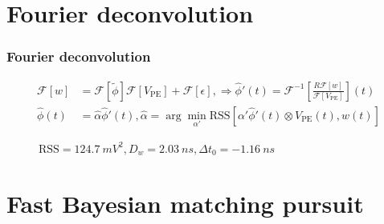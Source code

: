 \documentclass{beamer}
\begin{document}
\begin{CJK*}{UTF8}{gbsn}
\section{Fourier deconvolution}

\begin{frame}
\frametitle{Fourier deconvolution}
\begin{align*}
  \mathcal{F}[w] &= \mathcal{F}[\tilde{\phi}]\mathcal{F}[V_\mathrm{PE}] + \mathcal{F}[\epsilon],\Rightarrow \hat{\phi}'(t) = \mathcal{F}^{-1}\left[\frac{R \mathcal{F}[w]}{\mathcal{F}[V_\mathrm{PE}]}\right](t) \\
  \hat{\phi}(t) &= \hat{\alpha}\hat{\phi}'(t),\hat{\alpha} = \arg \underset{\alpha'}{\min}\mathrm{RSS}\left[\alpha'\hat{\phi}'(t)\otimes V_\mathrm{PE}(t),w(t)\right]
\end{align*}
\begin{figure}
    \centering
    \resizebox{0.55\textwidth}{!}{}
    \caption{$\mathrm{RSS}=\SI{124.7}{mV^2},D_w=\SI{2.03}{ns},\Delta t_0=\SI{-1.16}{ns}$}
\end{figure}
\end{frame}

\section{Fast Bayesian matching pursuit}


\end{CJK*}
\end{document}
